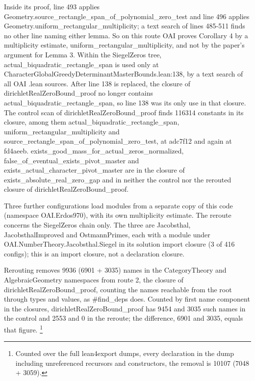 Inside its proof, line 493 applies Geometry.source\_rectangle\_span\_of\_polynomial\_zero\_test and line 496 applies Geometry.uniform\_rectangular\_multiplicity; a text search of lines 485-511 finds no other line naming either lemma. %
So on this route OAI proves Corollary 4 by a multiplicity estimate, uniform\_rectangular\_multiplicity, and not by the paper's argument for Lemma 3. %
Within the SiegelZeros tree, actual\_biquadratic\_rectangle\_span is used only at CharacterGlobalGreedyDeterminantMasterBounds.lean:138, by a text search of all OAI .lean sources. %
After line 138 is replaced, the closure of dirichletRealZeroBound\_proof no longer contains actual\_biquadratic\_rectangle\_span, so line 138 was its only use in that closure. %
The control scan of dirichletRealZeroBound\_proof finds 116314 constants in its closure, among them actual\_biquadratic\_rectangle\_span, uniform\_rectangular\_multiplicity and source\_rectangle\_span\_of\_polynomial\_zero\_test, at adc7f12 and again at fd4aeeb. %
exists\_good\_mass\_for\_actual\_zeros\_normalized, false\_of\_eventual\_exists\_pivot\_master and exists\_actual\_character\_pivot\_master are in the closure of exists\_absolute\_real\_zero\_gap and in neither the control nor the rerouted closure of dirichletRealZeroBound\_proof. %

Three further configurations load modules from a separate copy of this code (namespace OAI.Erdos970), with its own multiplicity estimate. %
The reroute concerns the SiegelZeros chain only. %
The three are Jacobsthal, JacobsthalImproved and OstmannPrimes, each with a module under OAI.NumberTheory.Jacobsthal.Siegel in its solution import closure (3 of 416 configs); this is an import closure, not a declaration closure. %

Rerouting removes 9936 (6901 + 3035) names in the CategoryTheory and AlgebraicGeometry namespaces from route 2, the closure of dirichletRealZeroBound\_proof, counting the names reachable from the root through types and values, as \#find\_deps does. %
Counted by first name component in the closures, dirichletRealZeroBound\_proof has 9454 and 3035 such names in the control and 2553 and 0 in the reroute; the difference, 6901 and 3035, equals that figure. %
\footnote{Counted over the full lean4export dumps, every declaration in the dump including unreferenced recursors and constructors, the removal is 10107 (7048 + 3059). %
}

